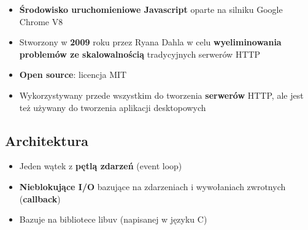 \documentclass[../main.tex]{subfiles}
\begin{document}
    \begin{itemize}
        \item \textbf{Środowisko uruchomieniowe Javascript} oparte na silniku Google Chrome V8
        \item Stworzony w \textbf{2009} roku przez Ryana Dahla w celu \textbf{wyeliminowania problemów ze skalowalnością} tradycyjnych serwerów HTTP
        \item \textbf{Open source}: licencja MIT
        \item Wykorzystywany przede wszystkim do tworzenia \textbf{serwerów} HTTP, ale jest też używany do tworzenia aplikacji desktopowych
    \end{itemize}

    \subsection{Architektura}
    \begin{itemize}
        \item Jeden wątek z \textbf{pętlą zdarzeń} (event loop)
        \item \textbf{Nieblokujące I/O} bazujące na zdarzeniach i wywołaniach zwrotnych (\textbf{callback})
        \item Bazuje na bibliotece libuv (napisanej w języku C)
    \end{itemize}
\end{document}
